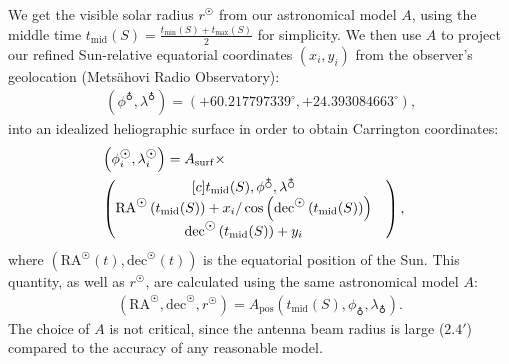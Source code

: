 \documentclass{aa}
\newcommand{\arrc}[1]{\begin{matrix}[c] #1 \end{matrix}}
\newcommand{\eqnl}[2]{\begin{eqnarray}\label{#1}#2\end{eqnarray}}
\newcommand{\s}[2]{{#1}_{\mathrm{#2}}}
\begin{document}
We get the visible solar radius $r^{\astrosun}$ from our astronomical model $A$, using the middle time $\s{t}{mid}(S) = 
\frac{\s{t}{min}(S) + \s{t}{max}(S)}{2}$ for simplicity. We then use $A$ to project our refined Sun-relative equatorial coordinates $(x_i,y_i)$ 
from the observer's geolocation (Metsähovi Radio Observatory):
\eqnl{mro_geolocation}{
(\phi^{\earth}, \lambda^{\earth}) = \left( +60.217797339^{\circ}, +24.393084663^{\circ} 
\right) \text{,}}
into an idealized heliographic surface 
in order to obtain Carrington coordinates:
\eqnl{carrington_coordinates}{
&\left( \phi^{\astrosun}_i, 
\lambda^{\astrosun}_i \right) = A_{\rm surf} \times& \\
&\left( \arrc{\s{t}{mid}(S), \phi^{\earth}, \lambda^{\earth}
\\
\mathrm{RA}^{\astrosun} \left( \s{t}{mid}(S) \right) + x_i / \cos \left( \mathrm{dec}^{\astrosun} \left( \s{t}{mid}(S) \right) \right)&
\\
\mathrm{dec}^{\astrosun} \left( \s{t}{mid}(S) \right) + y_i} \right) \nonumber 
\text{,}
}
where $\left( \mathrm{RA}^{\astrosun}(t), \mathrm{dec}^{\astrosun}(t) \right)$ is the equatorial position of the Sun. This quantity, as well as $r^{\astrosun}$, are calculated using the same astronomical model $A$:
\eqnl{astromodel}{
\left( \mathrm{RA}^{\astrosun}, \mathrm{dec}^{\astrosun}, r^{\astrosun} \right) = \s{A}{pos} \left( \s{t}{mid}(S), \phi_{\earth}, \lambda_{\earth} \right) \text{.}
}
The choice of $A$ is not critical, since the antenna beam radius is large ($2.4 \prime$) compared to the accuracy of any 
reasonable model.
\end{document}
